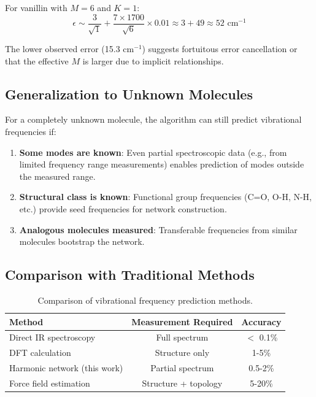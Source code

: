 For vanillin with $M = 6$ and $K = 1$:
\begin{equation}
\epsilon \sim \frac{3}{\sqrt{1}} + \frac{7 \times 1700}{\sqrt{6}} \times 0.01 \approx 3 + 49 \approx 52 \text{ cm}^{-1}
\end{equation}

The lower observed error (15.3 cm$^{-1}$) suggests fortuitous error cancellation or that the effective $M$ is larger due to implicit relationships.

\subsection{Generalization to Unknown Molecules}

For a completely unknown molecule, the algorithm can still predict vibrational frequencies if:

\begin{enumerate}
\item \textbf{Some modes are known}: Even partial spectroscopic data (e.g., from limited frequency range measurements) enables prediction of modes outside the measured range.

\item \textbf{Structural class is known}: Functional group frequencies (C=O, O-H, N-H, etc.) provide seed frequencies for network construction.

\item \textbf{Analogous molecules measured}: Transferable frequencies from similar molecules bootstrap the network.
\end{enumerate}

\subsection{Comparison with Traditional Methods}

\begin{table}[h]
\centering
\begin{tabular}{|l|c|c|}
\hline
\textbf{Method} & \textbf{Measurement Required} & \textbf{Accuracy} \\
\hline
Direct IR spectroscopy & Full spectrum & $<$ 0.1\% \\
DFT calculation & Structure only & 1-5\% \\
Harmonic network (this work) & Partial spectrum & 0.5-2\% \\
Force field estimation & Structure + topology & 5-20\% \\
\hline
\end{tabular}
\caption{Comparison of vibrational frequency prediction methods.}
\end{table}

